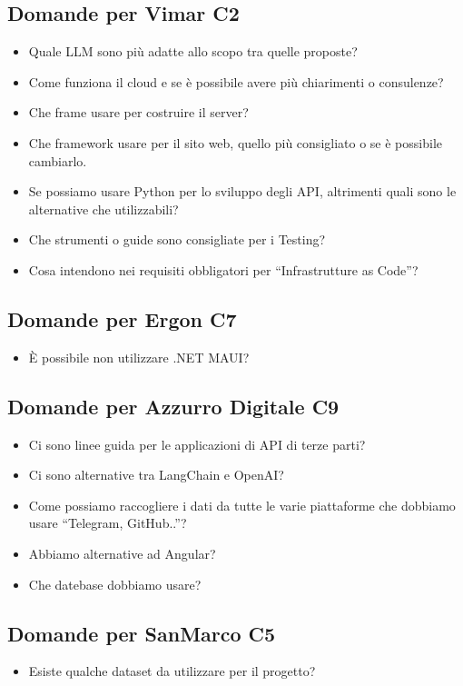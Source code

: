 \documentclass{article}
\begin{document}
\subsection{Domande per Vimar C2}\label{subsec:domande-vimar}
\begin{itemize}
    \item Quale LLM sono più adatte allo scopo tra quelle proposte?
    \item Come funziona il cloud e se è possibile avere più chiarimenti o consulenze?
    \item Che frame usare per costruire il server?
    \item Che framework usare per il sito web, quello più consigliato o se è possibile cambiarlo.
    \item Se possiamo usare Python per lo sviluppo degli API, altrimenti quali sono le alternative che utilizzabili?
    \item Che strumenti o guide sono consigliate per i Testing?
    \item Cosa intendono nei requisiti obbligatori per “Infrastrutture as Code”?
\end{itemize}

\subsection{Domande per Ergon C7}\label{subsec:domande-ergon}
\begin{itemize}
    \item È possibile non utilizzare .NET MAUI?
\end{itemize}

\subsection{Domande per Azzurro Digitale C9}\label{subsec:domande-azzurro}
\begin{itemize}
    \item Ci sono linee guida per le applicazioni di API di terze parti?
    \item Ci sono alternative tra LangChain e OpenAI?
    \item Come possiamo raccogliere i dati da tutte le varie piattaforme che dobbiamo usare “Telegram, GitHub..”?
    \item Abbiamo alternative ad Angular? 
    \item Che datebase dobbiamo usare?
\end{itemize}

\subsection{Domande per SanMarco C5}\label{subsec:domande-sanmarco}
\begin{itemize}
    \item Esiste qualche dataset da utilizzare per il progetto?
\end{itemize}
\end{document}

